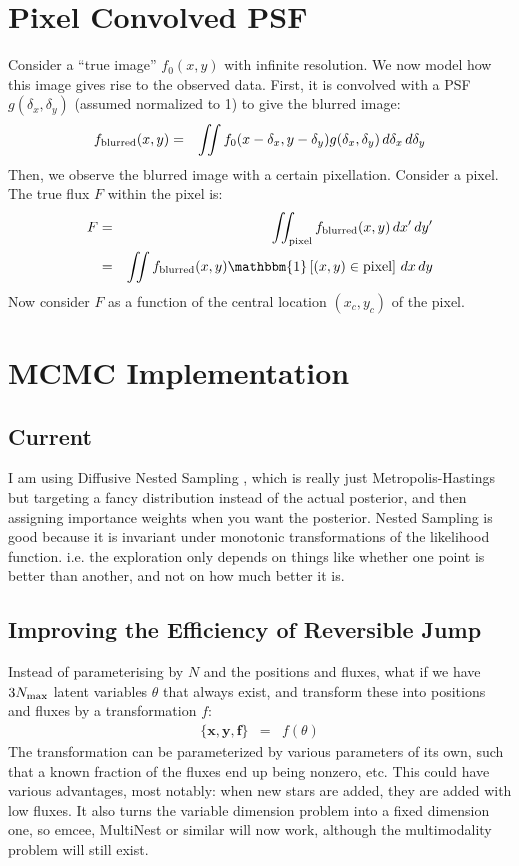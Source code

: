 \documentclass[letterpaper, 11pt]{article}
\begin{document}
\appendix
\section{Pixel Convolved PSF}
Consider a ``true image'' $f_0(x, y)$ with infinite resolution. We now model how
this image gives rise to the observed data. First, it is convolved with a
PSF $g(\delta_x, \delta_y)$ (assumed normalized to 1) to give the blurred image:
\begin{eqnarray}
f_{\rm{blurred}}(x, y) &=& \iint f_0(x-\delta_x, y-\delta_y)
g(\delta_x, \delta_y) \, d\delta_x \, d\delta_y \label{blur}
\end{eqnarray}
Then, we observe the blurred image with a certain pixellation. Consider a pixel.
The true flux $F$ within the pixel is:
\begin{eqnarray}
F &=& \iint_{\rm pixel} f_{\rm blurred}(x, y) \,dx'\,dy'\\
&=& \iint f_{\rm blurred}(x, y)\mathbbm{1}\left[(x,y) \in \textnormal{pixel}
\right] \,dx\,dy \label{pixel}
\end{eqnarray}
Now consider $F$ as a function of the central location $(x_c, y_c)$ of the
pixel.


\section{MCMC Implementation}
\subsection{Current}
I am using Diffusive Nested Sampling \citep{dnest}, which is really just
Metropolis-Hastings but targeting a fancy distribution instead of the actual
posterior, and then assigning importance weights when you want the posterior.
Nested Sampling is good because it is invariant under monotonic transformations
of the likelihood function. i.e. the exploration only depends on things like
whether one point is better than another, and not on how much better it is.

\subsection{Improving the Efficiency of Reversible Jump}
Instead of parameterising by $N$ and the positions and fluxes, what if we have
$3N_{\rm max}$ latent variables $\theta$ that always exist, and transform these
into
positions and fluxes by a transformation $f$:
\begin{eqnarray}
\{\mathbf{x}, \mathbf{y}, \mathbf{f}\} &=& f(\theta)
\end{eqnarray}
The transformation can be parameterized by various parameters of its own, such
that a known fraction of the fluxes end up being nonzero, etc. This could have
various advantages, most notably: when new stars are added, they are added with
low fluxes. It also turns the variable dimension problem into a fixed dimension
one, so emcee, MultiNest or similar will now work, although the multimodality problem will
still exist.
\end{document}
